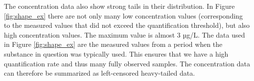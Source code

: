 

The concentration data also show strong tails in their distribution. In Figure \ref{fig:shape_ex} there are not only many low concentration values (corresponding to the measured values that did not exceed the quantification threshold), but also high concentration values. The maximum value is almost 3 µg/L. The data used in Figure \ref{fig:shape_ex} are the measured values from a period when the substance in question was typically used. This ensures that we have a high quantification rate and thus many fully observed samples. The concentration data can therefore be summarized as left-censored heavy-tailed data.

